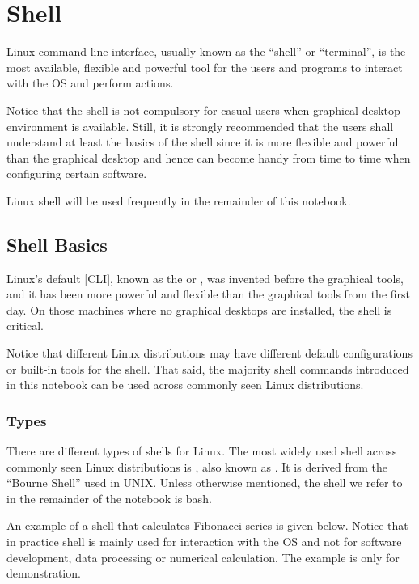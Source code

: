 \chapter{Shell} \label{ch:sb}

Linux command line interface, usually known as the ``shell'' or ``terminal'', is the most available, flexible and powerful tool for the users and programs to interact with the OS and perform actions.

Notice that the shell is not compulsory for casual users when graphical desktop environment is available. Still, it is strongly recommended that the users shall understand at least the basics of the shell since it is more flexible and powerful than the graphical desktop and hence can become handy from time to time when configuring certain software.

Linux shell will be used frequently in the remainder of this notebook.

\section{Shell Basics}

Linux's default [CLI], known as the  or , was invented before the graphical tools, and it has been more powerful and flexible than the graphical tools from the first day. On those machines where no graphical desktops are installed, the shell is critical.

Notice that different Linux distributions may have different default configurations or built-in tools for the shell. That said, the majority shell commands introduced in this notebook can be used across commonly seen Linux distributions.

\subsection{Types}

There are different types of shells for Linux. The most widely used shell across commonly seen Linux distributions is , also known as . It is derived from the ``Bourne Shell'' used in UNIX. Unless otherwise mentioned, the shell we refer to in the remainder of the notebook is bash. 

An example of a shell that calculates Fibonacci series is given below. Notice that in practice shell is mainly used for interaction with the OS and not for software development, data processing or numerical calculation. The example is only for demonstration.

